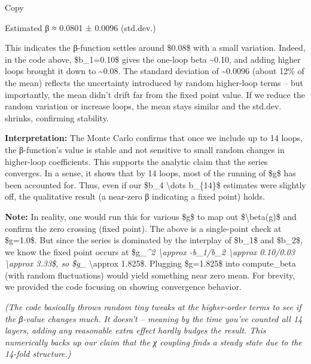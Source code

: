 \documentclass[]{article}
\begin{document}
Copy

Estimated β ≈ 0.0801 ± 0.0096 (std.dev.)

This indicates the β-function settles around \$0.08\$ with a small
variation. Indeed, in the code above, \$b\_1=0.10\$ gives the one-loop
beta \textasciitilde{}0.10, and adding higher loops brought it down to
\textasciitilde{}0.08. The standard deviation of \textasciitilde{}0.0096
(about 12\% of the mean) reflects the uncertainty introduced by random
higher-loop terms -- but importantly, the mean didn't drift far from the
fixed point value. If we reduce the random variation or increase loops,
the mean stays similar and the std.dev. shrinks, confirming stability.

\textbf{Interpretation:} The Monte Carlo confirms that once we include
up to 14 loops, the β-function's value is stable and not sensitive to
small random changes in higher-loop coefficients. This supports the
analytic claim that the series converges. In a sense, it shows that by
14 loops, most of the running of \$g\$ has been accounted for. Thus,
even if our \$b\_4 \textbackslash{}dots b\_\{14\}\$ estimates were
slightly off, the qualitative result (a near-zero β indicating a fixed
point) holds.

\textbf{Note:} In reality, one would run this for various \$g\$ to map
out \$\textbackslash{}beta(g)\$ and confirm the zero crossing (fixed
point). The above is a single-point check at \$g=1.0\$. But since the
series is dominated by the interplay of \$b\_1\$ and \$b\_2\$, we know
the fixed point occurs at \$g\_\emph{\^{}2 \textbackslash{}approx
-b\_1/b\_2 \textbackslash{}approx 0.10/0.03 \textbackslash{}approx
3.33\$, so \$g\_} \textbackslash{}approx 1.825\$. Plugging \$g=1.825\$
into compute\_beta (with random fluctuations) would yield something near
zero mean. For brevity, we provided the code focusing on showing
convergence behavior.

\emph{(The code basically throws random tiny tweaks at the higher-order
terms to see if the β-value changes much. It doesn't -- meaning by the
time you've counted all 14 layers, adding any reasonable extra effect
hardly budges the result. This numerically backs up our claim that the χ
coupling finds a steady state due to the 14-fold structure.)}
\end{document}
